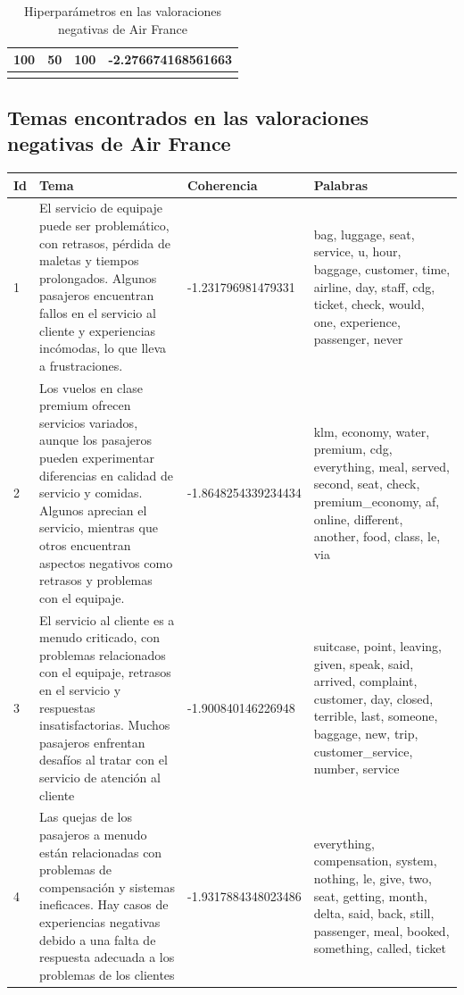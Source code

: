 \documentclass{report}
\begin{document}
{\begin{longtable}{|c|c|c|c|}
                    \hline
                    100 & 50 & 100 & -2.276674168561663 \\
                    \hline
                    \caption{Hiperparámetros en las valoraciones negativas de Air France}
                \end{longtable}
            \clearpage\subsection{Temas encontrados en las valoraciones negativas de Air France}
                \label{tab:temas_air_france_negativas}
                \begin{longtable}{|p{1cm}|p{4cm}|p{4cm}|p{6cm}|}
                    \hline
                    \textbf{Id} & \textbf{Tema} & \textbf{Coherencia} & \textbf{Palabras} \\
                    \hline
                    1 & El servicio de equipaje puede ser problemático, con retrasos, pérdida de maletas y tiempos prolongados. Algunos pasajeros encuentran fallos en el servicio al cliente y experiencias incómodas, lo que lleva a frustraciones. & -1.231796981479331 & bag, luggage, seat, service, u, hour, baggage, customer, time, airline, day, staff, cdg, ticket, check, would, one, experience, passenger, never \\
                    \hline
                    2 & Los vuelos en clase premium ofrecen servicios variados, aunque los pasajeros pueden experimentar diferencias en calidad de servicio y comidas. Algunos aprecian el servicio, mientras que otros encuentran aspectos negativos como retrasos y problemas con el equipaje. & -1.8648254339234434 & klm, economy, water, premium, cdg, everything, meal, served, second, seat, check, premium\_economy, af, online, different, another, food, class, le, via \\
                    \hline
                    3 & El servicio al cliente es a menudo criticado, con problemas relacionados con el equipaje, retrasos en el servicio y respuestas insatisfactorias. Muchos pasajeros enfrentan desafíos al tratar con el servicio de atención al cliente & -1.900840146226948 & suitcase, point, leaving, given, speak, said, arrived, complaint, customer, day, closed, terrible, last, someone, baggage, new, trip, customer\_service, number, service \\
                    \hline
                    4 & Las quejas de los pasajeros a menudo están relacionadas con problemas de compensación y sistemas ineficaces. Hay casos de experiencias negativas debido a una falta de respuesta adecuada a los problemas de los clientes & -1.9317884348023486 & everything, compensation, system, nothing, le, give, two, seat, getting, month, delta, said, back, still, passenger, meal, booked, something, called, ticket \\

\end{longtable}}
\end{document}
